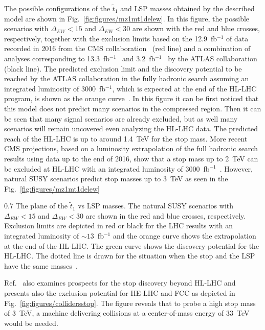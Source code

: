 The possible configurations of the $\tilde{t}_{1}$ and LSP masses obtained by the described model are shown in Fig.~\ref{fig:figures/mz1mt1delew}. In this figure, the possible scenarios with $\Delta_{EW} <15$ and $\Delta_{EW} <30$ are shown with the red and blue crosses, respectively, together with the exclusion limits based on the 12.9~fb$^{-1}$ of data recorded in  2016 from the CMS collaboration~\cite{CMS:2016hxa} (red line) and a combination of analyses corresponding to 13.3~fb$^{-1}$~\cite{ATLAS:2016jaa, ATLAS:2016ljb, ATLAS:2016xcm} and  3.2~fb$^{-1}$~\cite{Aaboud:2016tnv}  by the ATLAS collaboration (black line). The predicted exclusion limit and the discovery potential to be reached by the ATLAS collaboration in the fully hadronic search assuming an integrated luminosity of $3000$~fb$^{-1}$, which is expected at the end of the  HL-LHC program, is shown as the orange curve~\cite{ATL-PHYS-PUB-2013-011}. In this figure it can be first noticed that this model does not predict many scenarios in the compressed region. Then it can be seen that many signal scenarios are already excluded, but as well many scenarios will remain uncovered even analyzing the HL-LHC data. The predicted reach of the HL-LHC is up to around 1.4~TeV for the stop mass. More recent CMS projections, based on a luminosity extrapolation of the full hadronic search results using data up to the end of 2016, show that a stop mass up to 2~TeV can be excluded at HL-LHC with an integrated luminosity of 3000~fb$^{-1}$~\cite{website:moriond}. However, natural SUSY scenarios predict stop masses up to 3~TeV as seen in the Fig.~\ref{fig:figures/mz1mt1delew}   

                 {0.7}       %
                 { The plane of the $\tilde{t}_{1}$ vs LSP masses. The natural SUSY scenarios with $\Delta_{EW} <15$ and $\Delta_{EW} <30$ are shown in the red and blue crosses, respectively. Exclusion limits are depicted in red or black for the LHC results with an integrated luminosity of $\sim 13$~fb$^{-1}$ and the orange curve shows the extrapolation at the end of the HL-LHC. The green curve shows the discovery potential for the HL-LHC. The dotted line is drawn for the situation when the stop and the LSP have the same masses~\cite{Baer:2016bwh}.   }

Ref.~\cite{Baer:2016bwh} also examines prospects for the stop discovery beyond HL-LHC and presents also the exclusion potential for HE-LHC and FCC as depicted in Fig.~\ref{fig:figures/collidersstop}. The figure reveals that to probe a high stop mass of 3~TeV, a machine delivering collisions at a center-of-mass energy of 33~TeV would be needed. 

